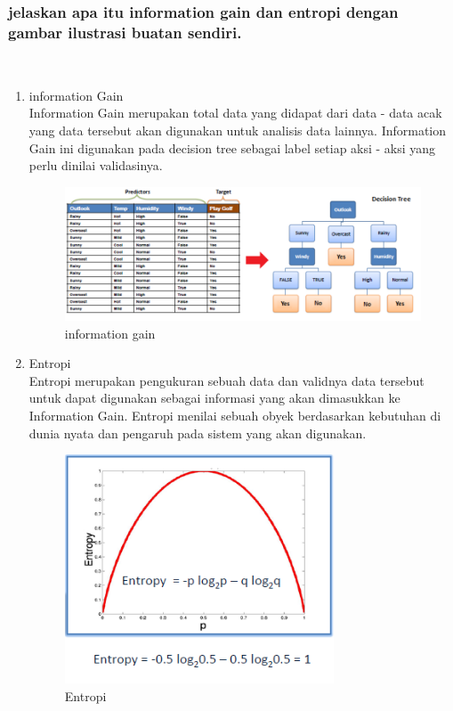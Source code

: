\subsubsection{jelaskan apa itu information gain dan entropi dengan gambar ilustrasi buatan sendiri.}
\hfill\\
\begin{enumerate}
	\item information Gain
	\hfill\\
	Information Gain merupakan total data yang didapat dari data - data acak yang data tersebut akan digunakan untuk analisis data lainnya. Information Gain ini digunakan pada decision tree sebagai label setiap aksi - aksi yang perlu dinilai validasinya. 
\begin{figure}[H]
    \includegraphics[width=12cm]{figures/1174087/2/ig.png}
    \centering
    \caption{information gain}
\end{figure}

	\item Entropi
	\hfill\\
	Entropi merupakan pengukuran sebuah data dan validnya data tersebut untuk dapat digunakan sebagai informasi yang akan dimasukkan ke Information Gain. Entropi menilai sebuah obyek berdasarkan kebutuhan di dunia nyata dan pengaruh pada sistem yang akan digunakan.
\begin{figure}[H]
    \includegraphics[width=8cm]{figures/1174087/2/e.png}
    \centering
    \caption{Entropi}
\end{figure}
\end{enumerate}



